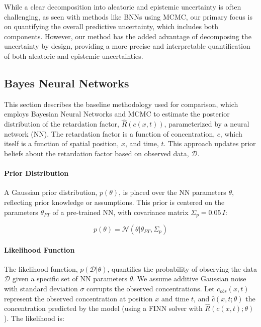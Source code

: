 While a clear decomposition into aleatoric and epistemic uncertainty is often challenging, as seen with methods like BNNs using MCMC, our primary focus is on quantifying the overall predictive uncertainty, which includes both components. However, our method has the added advantage of decomposing the uncertainty by design, providing a more precise and interpretable quantification of both aleatoric and epistemic uncertainties.





\subsection{Bayes Neural Networks}
\label{sec:bayes_nn}
This section describes the baseline methodology used for comparison, which employs Bayesian Neural Networks and MCMC to estimate the posterior distribution of the retardation factor, $\hat{R}(c(x,t))$, parameterized by a neural network (NN). The retardation factor is a function of concentration, $c$, which itself is a function of spatial position, $x$, and time, $t$. This approach updates prior beliefs about the retardation factor based on observed data, $\mathcal{D}$.

\paragraph{Prior Distribution}

A Gaussian prior distribution, $p(\theta)$, is placed over the NN parameters $\theta$, reflecting prior knowledge or assumptions. This prior is centered on the parameters $\theta_{PT}$ of a pre-trained NN, with covariance matrix $\Sigma_p = 0.05 \, I$:


\begin{equation*}
p(\theta) = \mathcal{N}(\theta | \theta_{PT}, \Sigma_p)
\end{equation*}

\paragraph{Likelihood Function}

The likelihood function, $p(\mathcal{D} | \theta)$, quantifies the probability of observing the data $\mathcal{D}$ given a specific set of NN parameters $\theta$. We assume additive Gaussian noise with standard deviation $\sigma$ corrupts the observed concentrations. Let $c_{obs}(x,t)$ represent the observed concentration at position $x$ and time $t$, and $\hat{c}(x,t; \theta)$ the concentration predicted by the model (using a FINN solver with $\hat{R}(c(x,t);\theta)$). The likelihood is:

